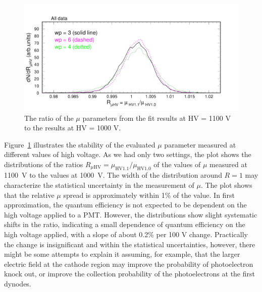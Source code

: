 \begin{figure}[h!]
	\centering
	\includegraphics[width=0.98\linewidth, trim=0 12 50 35, clip]{figures/pglobal_mHV.pdf}
	\caption{The ratio of the $\mu$ parameters from the fit results at HV = 1100 V to the results at HV = 1000 V.}
	\label{fig:pglobal_mHV}
\end{figure}
Figure~\ref{fig:pglobal_mHV} illustrates the stability of the evaluated $\mu$ parameter measured at different values of high voltage. As we had only two settings, the plot shows the distributions of the ratios $R_{\mu\mathrm{HV}} = \mu_{\mathrm{HV1.1}}/\mu_{\mathrm{HV1.0}}$ of the values of $\mu$ measured at 1100~V to the values at 1000~V. The width of the distribution around $R = 1$ may characterize the statistical uncertainty in the measurement of $\mu$. The plot shows that the relative $\mu$ spread is approximately within 1\% of the value. In first approximation, the quantum efficiency is not expected to be dependent on the high voltage applied to a PMT. However, the distributions show slight systematic shifts in the ratio, indicating a small dependence of quantum efficiency on the high voltage applied, with a slope of about 0.2\% per 100 V change. Practically the change is insignificant and within the statistical uncertainties, however, there might be some attempts to explain it assuming, for example, that the larger electric field at the cathode region may improve the probability of photoelectron knock out, or improve the collection probability of the photoelectrons at the first dynodes.

